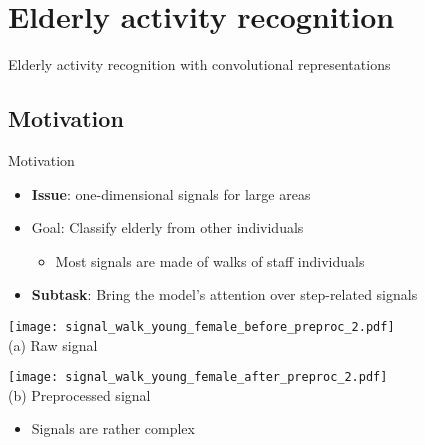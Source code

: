 \section{Elderly activity recognition}

\begin{frame}{}
    \centering
    \vspace{3cm}
    \Huge
    \textcolor{myblue}{Elderly activity recognition with convolutional representations}
\end{frame}


\subsection{Motivation}

\begin{frame}{Motivation}{}
\begin{itemize}
    \item \textbf{Issue}: one-dimensional signals for large areas
    \item Goal: Classify elderly from other individuals
    \begin{itemize}
        \item Most signals are made of walks of staff individuals
    \end{itemize}
    \item \textbf{Subtask}: Bring the model's attention over step-related signals
\end{itemize}

\pause
    \begin{minipage}{\linewidth}
        \centering
        \begin{minipage}{0.49\linewidth}
            \centering
            \texttt{[image: signal\_walk\_young\_female\_before\_preproc\_2.pdf]}\\
            {\small (a)\; Raw signal}
        \end{minipage}
        \begin{minipage}{0.49\linewidth}
            \centering
            \texttt{[image: signal\_walk\_young\_female\_after\_preproc\_2.pdf]}\\
            {\small (b)\; Preprocessed signal}
        \end{minipage}
    \end{minipage}
\begin{itemize}
    \item Signals are rather complex
\end{itemize}


\end{frame}
